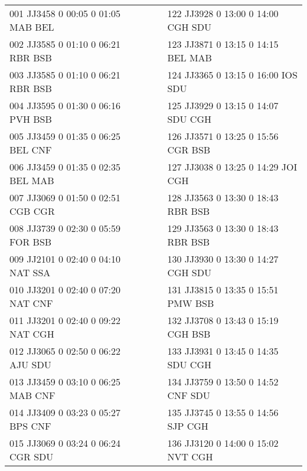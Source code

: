\begin{scriptsize}

\begin{longtable}{l c c l}

001 JJ3458 0 00:05 0 01:05 MAB BEL & & & 122 JJ3928 0 13:00 0 14:00 CGH SDU \\

002 JJ3585 0 01:10 0 06:21 RBR BSB & & & 123 JJ3871 0 13:15 0 14:15 BEL MAB \\

003 JJ3585 0 01:10 0 06:21 RBR BSB & & & 124 JJ3365 0 13:15 0 16:00 IOS SDU \\

004 JJ3595 0 01:30 0 06:16 PVH BSB & & & 125 JJ3929 0 13:15 0 14:07 SDU CGH \\

005 JJ3459 0 01:35 0 06:25 BEL CNF & & & 126 JJ3571 0 13:25 0 15:56 CGR BSB \\

006 JJ3459 0 01:35 0 02:35 BEL MAB & & & 127 JJ3038 0 13:25 0 14:29 JOI CGH \\

007 JJ3069 0 01:50 0 02:51 CGB CGR & & & 128 JJ3563 0 13:30 0 18:43 RBR BSB \\

008 JJ3739 0 02:30 0 05:59 FOR BSB & & & 129 JJ3563 0 13:30 0 18:43 RBR BSB \\

009 JJ2101 0 02:40 0 04:10 NAT SSA & & & 130 JJ3930 0 13:30 0 14:27 CGH SDU \\

010 JJ3201 0 02:40 0 07:20 NAT CNF & & & 131 JJ3815 0 13:35 0 15:51 PMW BSB \\

011 JJ3201 0 02:40 0 09:22 NAT CGH & & & 132 JJ3708 0 13:43 0 15:19 CGH BSB \\

012 JJ3065 0 02:50 0 06:22 AJU SDU & & & 133 JJ3931 0 13:45 0 14:35 SDU CGH \\

013 JJ3459 0 03:10 0 06:25 MAB CNF & & & 134 JJ3759 0 13:50 0 14:52 CNF SDU \\

014 JJ3409 0 03:23 0 05:27 BPS CNF & & & 135 JJ3745 0 13:55 0 14:56 SJP CGH \\

015 JJ3069 0 03:24 0 06:24 CGR SDU & & & 136 JJ3120 0 14:00 0 15:02 NVT CGH \\


\end{longtable}
\end{scriptsize}
